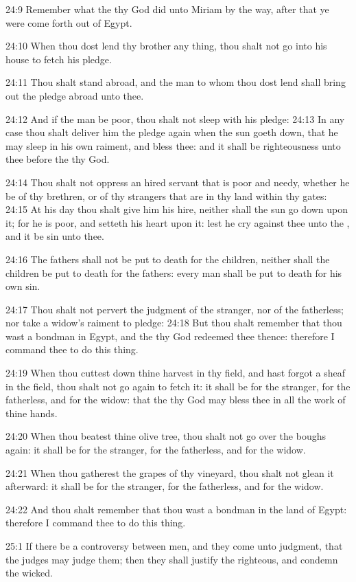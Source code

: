 24:9 Remember what the \LORD thy God did unto Miriam by the way, after that ye were come forth out of Egypt.

24:10 When thou dost lend thy brother any thing, thou shalt not go into his house to fetch his pledge.

24:11 Thou shalt stand abroad, and the man to whom thou dost lend shall bring out the pledge abroad unto thee.

24:12 And if the man be poor, thou shalt not sleep with his pledge: 24:13 In any case thou shalt deliver him the pledge again when the sun goeth down, that he may sleep in his own raiment, and bless thee: and it shall be righteousness unto thee before the \LORD thy God.

24:14 Thou shalt not oppress an hired servant that is poor and needy, whether he be of thy brethren, or of thy strangers that are in thy land within thy gates: 24:15 At his day thou shalt give him his hire, neither shall the sun go down upon it; for he is poor, and setteth his heart upon it: lest he cry against thee unto the \LORD, and it be sin unto thee.

24:16 The fathers shall not be put to death for the children, neither shall the children be put to death for the fathers: every man shall be put to death for his own sin.

24:17 Thou shalt not pervert the judgment of the stranger, nor of the fatherless; nor take a widow's raiment to pledge: 24:18 But thou shalt remember that thou wast a bondman in Egypt, and the \LORD thy God redeemed thee thence: therefore I command thee to do this thing.

24:19 When thou cuttest down thine harvest in thy field, and hast forgot a sheaf in the field, thou shalt not go again to fetch it: it shall be for the stranger, for the fatherless, and for the widow: that the \LORD thy God may bless thee in all the work of thine hands.

24:20 When thou beatest thine olive tree, thou shalt not go over the boughs again: it shall be for the stranger, for the fatherless, and for the widow.

24:21 When thou gatherest the grapes of thy vineyard, thou shalt not glean it afterward: it shall be for the stranger, for the fatherless, and for the widow.

24:22 And thou shalt remember that thou wast a bondman in the land of Egypt: therefore I command thee to do this thing.

25:1 If there be a controversy between men, and they come unto judgment, that the judges may judge them; then they shall justify the righteous, and condemn the wicked.

